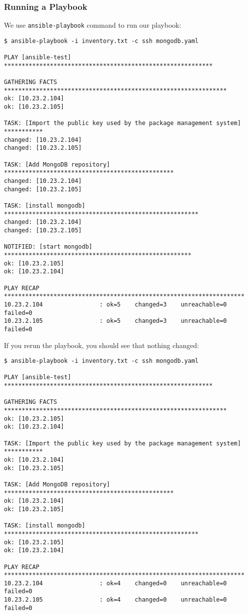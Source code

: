 \subsubsection{Running a Playbook}\label{running-a-playbook}

We use \texttt{ansible-playbook} command to run our playbook:

\begin{verbatim}
$ ansible-playbook -i inventory.txt -c ssh mongodb.yaml

PLAY [ansible-test] *********************************************************** 

GATHERING FACTS *************************************************************** 
ok: [10.23.2.104]
ok: [10.23.2.105]

TASK: [Import the public key used by the package management system] *********** 
changed: [10.23.2.104]
changed: [10.23.2.105]

TASK: [Add MongoDB repository] ************************************************ 
changed: [10.23.2.104]
changed: [10.23.2.105]

TASK: [install mongodb] ******************************************************* 
changed: [10.23.2.104]
changed: [10.23.2.105]

NOTIFIED: [start mongodb] ***************************************************** 
ok: [10.23.2.105]
ok: [10.23.2.104]

PLAY RECAP ******************************************************************** 
10.23.2.104                : ok=5    changed=3    unreachable=0    failed=0   
10.23.2.105                : ok=5    changed=3    unreachable=0    failed=0
\end{verbatim}

If you rerun the playbook, you should see that nothing changed:

\begin{verbatim}
$ ansible-playbook -i inventory.txt -c ssh mongodb.yaml 

PLAY [ansible-test] *********************************************************** 

GATHERING FACTS *************************************************************** 
ok: [10.23.2.105]
ok: [10.23.2.104]

TASK: [Import the public key used by the package management system] *********** 
ok: [10.23.2.104]
ok: [10.23.2.105]

TASK: [Add MongoDB repository] ************************************************ 
ok: [10.23.2.104]
ok: [10.23.2.105]

TASK: [install mongodb] ******************************************************* 
ok: [10.23.2.105]
ok: [10.23.2.104]

PLAY RECAP ******************************************************************** 
10.23.2.104                : ok=4    changed=0    unreachable=0    failed=0   
10.23.2.105                : ok=4    changed=0    unreachable=0    failed=0
\end{verbatim}

